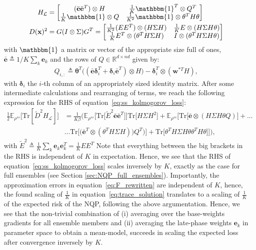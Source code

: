 \documentclass{article} \usepackage{iclr2021_conference,times}
\def\eqref#1{equation~\ref{#1}}
\begin{document}
\begin{align}
    H_{\mathcal{L}} &= \begin{bmatrix}
(\bar{\mathbf{e}} \bar{\mathbf{e}}^T) \otimes H & \frac{1}{K} \mathbbm{1}^T \otimes Q^T \\
\frac{1}{K} \mathbbm{1} \otimes Q &  \frac{1}{K^2} \mathbbm{1} \otimes \theta^TH\theta \\
\end{bmatrix} \\
D(\mathbf{x})^2 &= G(I\otimes \Sigma) G^T =  \begin{bmatrix}
\frac{1}{K^2} (EE^T) \otimes (H\Sigma H) & \frac{1}{K} E \otimes (H \Sigma H \theta)\\
\frac{1}{K}  E^T \otimes (\theta^TH \Sigma H) & I \otimes (\theta^TH\Sigma H \theta)
\end{bmatrix}
\end{align}
with $\mathbbm{1}$ a matrix or vector of the appropriate size full of ones, $\bar{\mathbf{e}} \triangleq  1/K \sum_k \mathbf{e}_k$ and the rows of $Q \in \mathbb{R}^{d\times nd}$ given by:
\begin{align}
    Q_{i,:} \triangleq \boldsymbol{\theta}^T\big((\bar{\mathbf{e}}\boldsymbol{\delta}_i^T + \boldsymbol{\delta}_i \bar{\mathbf{e}}^T) \otimes H\big) - \boldsymbol{\delta}_i^T \otimes (\mathbf{w}^{*T}H),
\end{align}
with $\boldsymbol{\delta}_i$ the $i$-th column of an appropriately sized identity matrix.
After some intermediate calculations and rearranging of terms, we reach the following expression for the RHS of \eqref{eq:ss_kolmogorov_loss}:
\begin{align}\label{eq:trace_solution}
    \frac{1}{2} \mathbb{E}_{\rho^{ss}} \big[\text{Tr}[\tilde{D}^2H_{\mathcal{L}}]\big] &= \frac{1}{K\beta} \Big( \mathbb{E}_{\rho^{ss}} \Big[\text{Tr}\big[\tilde{E}^2 \bar{\mathbf{e}} \bar{\mathbf{e}}^T\big]\Big] \text{Tr}\big[H\Sigma H^2\big] + 
    \mathbb{E}_{\rho^{ss}} \Big[\text{Tr}\big[\bar{\mathbf{e}}\otimes (H\Sigma H \theta Q)\big] + ... \nonumber \\  
    &... \text{Tr} \big[\big(\bar{\mathbf{e}}^T \otimes (\theta^T H\Sigma H)\big) Q^T)\big]  + \text{Tr} \big[\theta^TH\Sigma H\theta\theta^TH\theta\big]\Big]\Big),
\end{align}
with $\tilde{E}^2 \triangleq \frac{1}{K} \sum_k \mathbf{e}_k \mathbf{e}_k^T = \frac{1}{K} EE^T$
Note that everything between the big brackets in the RHS is independent of $K$ in expectation. Hence, we see that the RHS of \eqref{eq:ss_kolmogorov_loss} scales inversely by $K$, exactly as the case for full ensembles (see Section \ref{sec:NQP_full_ensembles}). Importantly, the approximation errors in \eqref{eq:F_rewritten} are independent of $K$, hence, the found scaling of $\frac{1}{K}$ in \eqref{eq:trace_solution} translates to a scaling of $\frac{1}{K}$ of the expected risk of the NQP, following the above argumentation. Hence, we see that the non-trivial combination of (i) averaging over the base-weights gradients for all ensemble members and (ii) averaging the late-phase weights $\mathbf{e}_k$ in parameter space to obtain a mean-model, succeeds in scaling the expected loss after convergence inversely by $K$.
\end{document}
